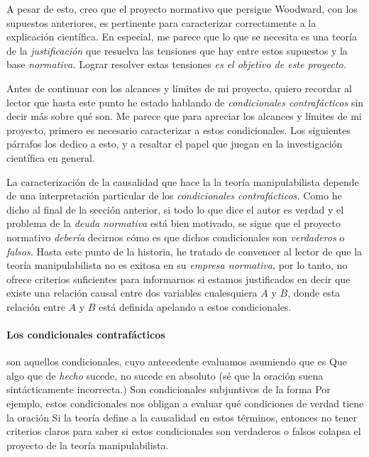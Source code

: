 A pesar de esto, creo que el proyecto
normativo que persigue Woodward, con los supuestos
anteriores, es pertinente para caracterizar correctamente a
la explicación científica. En especial,
me parece que lo que se necesita es una teoría de la
\emph{justificación} que resuelva las tensiones que hay
entre estos supuestos y la base \emph{normativa.} Lograr
resolver estas tensiones \emph{es el objetivo de este
proyecto.}   

Antes de continuar con los alcances y límites de mi
proyecto, quiero recordar al lector que hasta este punto he estado hablando de \emph{condicionales
contrafácticos} sin decir más sobre qué son. Me parece que
para apreciar los alcances y límites de mi proyecto, primero
es necesario caracterizar a estos condicionales. Los
siguientes párrafos los dedico a esto, y a resaltar el papel
que juegan en la investigación científica en general.

La caracterización de la causalidad que hace la
la teoría manipulabilista depende de una interpretación
particular de los \emph{condicionales contrafácticos.} Como
he dicho al final de la sección anterior, si todo lo que
dice el autor es verdad y el problema de la \emph{deuda
normativa} está bien motivado, se sigue que el proyecto
normativo \emph{debería} decirnos cómo es que dichos
condicionales son \emph{verdaderos} o \emph{falsos.} Hasta
este punto de la historia, he tratado de convencer al lector
de que la teoría manipulabilista no es exitosa en su
\emph{empresa normativa,} por lo tanto, no ofrece criterios
suficientes para informarnos si estamos justificados en
decir que existe una relación causal entre dos variables
cualesquiera $A$ y $B$, donde esta relación entre $A$ y $B$
está definida apelando a estos condicionales. 

\paragraph{Los condicionales contrafácticos} son aquellos
condicionales, cuyo antecedente evaluamos asumiendo que es
 Que algo que de \emph{hecho}
sucede, no sucede en absoluto (sé que la oración suena
sintácticamente incorrecta.) Son condicionales subjuntivos
de la forma  Por ejemplo, estos condicionales nos
obligan a evaluar qué condiciones de verdad tiene la oración
 Si la teoría define a la causalidad
en estos términos, entonces no tener criterios claros para
saber si estos condicionales son verdaderos o falsos
colapsa el proyecto de la teoría manipulabilista.
 
